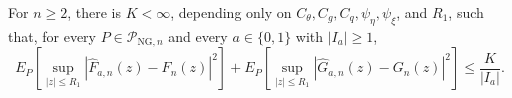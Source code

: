 For \(n\ge2\), there is \(K<\infty\), depending only on \(C_{\theta},C_g,C_q,\psi_{\eta},\psi_{\xi}\), and \(R_1\), such that, for every \(P\in\mathcal P_{\mathrm{NG},n}\) and every \(a\in\{0,1\}\) with \(|I_a|\ge1\),
\[
 E_P\!\left[\sup_{|z|\le R_1}|\widehat F_{a,n}(z)-F_n(z)|^2\right]
 +E_P\!\left[\sup_{|z|\le R_1}|\widehat G_{a,n}(z)-G_n(z)|^2\right]
 \le \frac{K}{|I_a|}.
\]